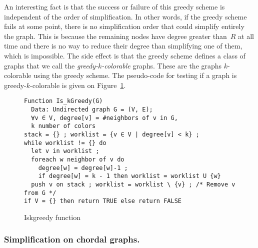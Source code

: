 {An interesting fact is that the success or failure of this greedy scheme is 
independent of the order of simplification. In other words, if the greedy 
scheme fails at some point, there is no simplification order that could 
simplify entirely the graph. This is because the remaining nodes have degree 
greater than~$R$ at all time and there is no way to reduce their degree than 
simplifying one of them, which is impossible. The side effect is that the 
greedy scheme defines a class of graphs that we call the 
\emph{greedy-$k$-colorable} graphs. These are the graphs $k$-colorable using 
the greedy scheme. The pseudo-code for testing if a graph is 
greedy-$k$-colorable is given on Figure~\ref{code:is-k-greedy}.



\begin{comment}
\begin{function}[h]
\captionlabel{\labelkgreedy}{Is\_kGreedy}{($G$)}
\KwData{Undirected graph $G=(V,E)$; $\forall v\in V$, degree[$v$] = \#neighbors 
of $v$ in $G$, $k$ number of colors}
stack = $\emptyset$ ;
$\mbox{worklist} = \{ v \in V \mid \mbox{degree[$v$]} < k\}$ \;
\While{$\mbox{worklist} \neq \emptyset$}{
  \KwLet $v \in \mbox{worklist}$ \;
  \ForEach{$w$ neighbor of $v$}{
     degree[$w$] \<- degree[w]-1 \;
     \lIf{$\mbox{degree[$w$]} = k-1$}{worklist \<- $\mbox{worklist} \cup \{w\}$}
  }
  push $v$ on stack ;
  worklist \<- $\mbox{worklist} \setminus \{v\}$  \tcc*{Remove $v$ from  $G$}
}
\lIf{$V = \emptyset$}{\Return{\KwTrue}}
\lElse{\Return{\KwFalse}}
\end{function} 
\end{comment} 

\begin{figure}
\begin{verbatim}
Function Is_kGreedy(G)
  Data: Undirected graph G = (V, E);
  ∀v ∈ V, degree[v] = #neighbors of v in G,
  k number of colors
stack = {} ; worklist = {v ∈ V | degree[v] < k} ;
while worklist != {} do
  let v in worklist ;
  foreach w neighbor of v do
    degree[w] = degree[w]-1 ;
    if degree[w] = k - 1 then worklist = worklist U {w}
  push v on stack ; worklist = worklist \ {v} ; /* Remove v from G */
if V = {} then return TRUE else return FALSE
\end{verbatim}
\caption{Iskgreedy function}
\label{code:is-k-greedy}
\end{figure}

\subsubsection{Simplification on chordal graphs.}

}
